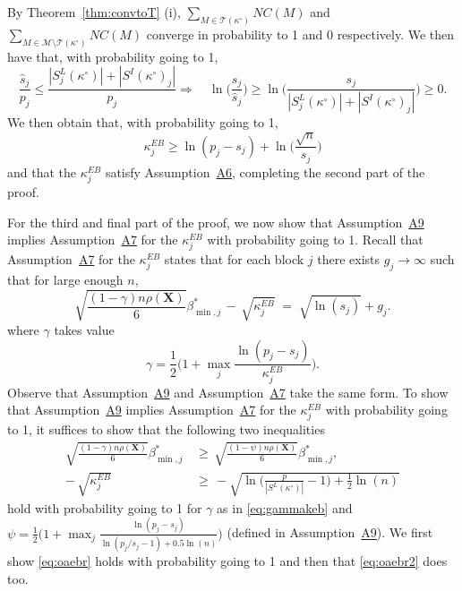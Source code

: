 \documentclass[bj,authoryear]{imsart}
\theoremstyle{plain}
\newcommand{\M}{\mathcal{M}}
\newcommand{\T}{\mathcal{T}}
\newcommand{\bs}{\boldsymbol}
\begin{document}
By Theorem~\ref{thm:convtoT} (i), $\sum_{M \in \T(\kappa^{\circ})}NC(M)$ and $\sum_{M \in \M\setminus\T(\kappa^{\circ})}NC(M)$ converge in probability to 1 and 0 respectively. We then have that, with probability going to 1,
\begin{equation*}
    \frac{\widehat{s}_j}{p_j}\leq \frac{|S^{L}_j(\kappa^{\circ})|+|S^{I}(\kappa^{\circ})_j|}{p_j} \Longrightarrow
    \quad\ln\Big(\frac{s_j}{\widehat{s}_j}\Big)\geq \ln\bigg(\frac{s_j}{|S^{L}_j(\kappa^{\circ})|+|S^{I}(\kappa^{\circ})_j|} \bigg) \geq 0.
\end{equation*}
We then obtain that, with probability going to 1,
\begin{equation}\label{eq:eeeeeeeh}
    \kappa^{EB}_j
    \geq  \ln(p_j-s_j)+\ln\Big(\frac{\sqrt{n}}{s_j}\Big)
\end{equation}
and that the $\kappa^{EB}_j$ satisfy Assumption~\hyperlink{lab:A6}{A6}, completing the second part of the proof.\medskip

For the third and final part of the proof, 
we now show that Assumption~\hyperlink{lab:A9}{A9} implies Assumption~\hyperlink{lab:A7}{A7} for the $\kappa_j^{EB}$ with probability going to 1. Recall that Assumption~\hyperlink{lab:A7}{A7} for the $\kappa_j^{EB}$ states that for each block $j$ there exists $g_j\to \infty$ such that for large enough $n$,
    \begin{equation*}
        \sqrt{\frac{(1-\gamma) n\rho(\bs X)}{6}}{{\beta_{\min,j}^*}} \,- \,\sqrt{\kappa^{EB}_j} \;=\; \sqrt{\ln(s_j)} + g_j .
    \end{equation*}
where $\gamma$ takes value
\begin{equation}\label{eq:gammakeb}
    \gamma=\frac12\Big(1+\max_j\frac{\ln(p_j-s_j)}{\kappa^{EB}_j}\Big).
\end{equation}
Observe that Assumption~\hyperlink{lab:A9}{A9} and Assumption~\hyperlink{lab:A7}{A7} take the same form. To show that Assumption~\hyperlink{lab:A9}{A9} implies Assumption~\hyperlink{lab:A7}{A7} for the $\kappa_j^{EB}$ with probability going to 1, it suffices to show that the following two inequalities
\begin{align}
    \sqrt{\frac{ (1-\gamma)n\rho(\bs X)}{6}}{\beta_{\min,j}^*} \,&\geq \,  \sqrt{\frac{ (1-\psi)n\rho(\bs X)}{6}}{\beta_{\min,j}^*}, \label{eq:oaebr} \\
    - \,\sqrt{\kappa^{EB}_j} \,&\geq \,-\sqrt{\ln\bigg(\frac{p}{|S^{L}(\kappa^{\circ})|}-1\bigg)+\frac12\ln(n)}\label{eq:oaebr2}
\end{align}
hold with probability going to 1 for $\gamma$ as in \eqref{eq:gammakeb} and $\psi=\frac12\big(1+\max_j \frac{\ln(p_j-s_j)}{\ln(p_j/s_j-1)+0.5\ln(n)}\big)$ (defined in Assumption~\hyperlink{lab:A9}{A9}). We first show \eqref{eq:oaebr} holds with probability going to 1 and then that \eqref{eq:oaebr2} does too.
\end{document}
